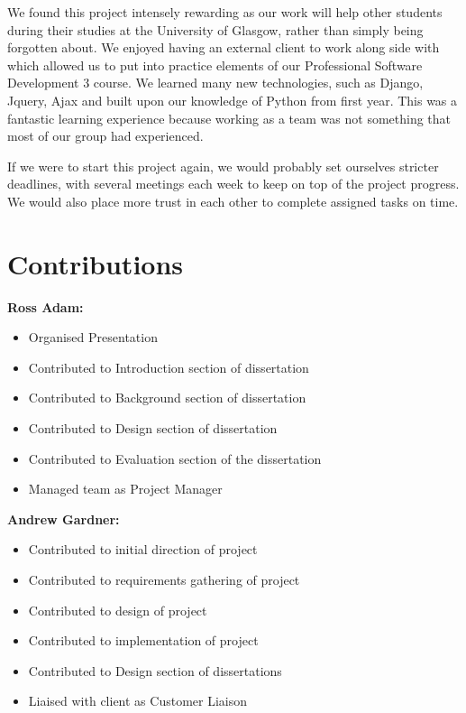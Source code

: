 \documentclass{l3proj}
\begin{document}
{We found this project intensely rewarding as our work will help other students during their studies at the University of Glasgow, rather than simply being forgotten about. We enjoyed having an external client to work along side with which allowed us to put into practice elements of our Professional Software Development 3 course. We learned many new technologies, such as Django, Jquery, Ajax and built upon our knowledge of Python from first year. This was a fantastic learning experience because working as a team was not something that most of our group had experienced.

If we were to start this project again, we would probably set ourselves stricter deadlines, with several meetings each week to keep on top of the project progress. We would also place more trust in each other to complete assigned tasks on time.

\section{Contributions}

\textbf{Ross Adam:}

\begin{itemize}
\item Organised Presentation
\item Contributed to Introduction section of dissertation
\item Contributed to Background section of dissertation
\item Contributed to Design section of dissertation
\item Contributed to Evaluation section of the dissertation
\item Managed team as Project Manager
\end{itemize}

\textbf{Andrew Gardner:}

\begin{itemize}
\item Contributed to initial direction of project 
\item Contributed to requirements gathering of project
\item Contributed to design of project
\item Contributed to implementation of project
\item Contributed to Design section of dissertations
\item Liaised with client as Customer Liaison
\end{itemize}

}
\end{document}
